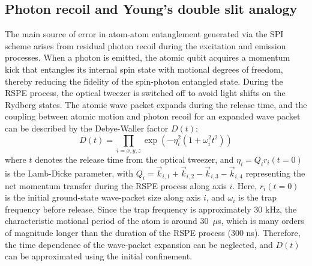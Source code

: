 \documentclass[aps,reprint,showpacs,superscriptaddress]{revtex4-2}
\begin{document}
\subsection{Photon recoil and Young's double slit analogy}
The main source of error in atom-atom entanglement generated via the SPI scheme arises from residual photon recoil during the excitation and emission processes. When a photon is emitted, the atomic qubit acquires a momentum kick that entangles its internal spin state with motional degrees of freedom, thereby reducing the fidelity of the spin-photon entangled state. During the RSPE process, the optical tweezer is switched off to avoid light shifts on the Rydberg states. The atomic wave packet expands during the release time, and the coupling between atomic motion and photon recoil for an expanded wave packet can be described by the Debye-Waller factor $D(t)$:
\begin{equation}
	D(t) = \prod_{i = x,y,z}\exp{(-\eta_{i}^2(1+\omega_i^2 t^2))}
\end{equation}
where $t$ denotes the release time from the optical tweezer, and $\eta_i = Q_i r_i(t=0)$ is the Lamb-Dicke parameter, with $Q_i = \vec{k}_{i,1} + \vec{k}_{i,2}-\vec{k}_{i,3}-\vec{k}_{i,4}$ representing the net momentum transfer during the RSPE process along axis $i$. Here, $r_i(t=0)$ is the initial ground-state wave-packet size along axis $i$, and $\omega_i$ is the trap frequency before release. Since the trap frequency is approximately 30 kHz, the characteristic motional period of the atom is around 30~$\mu$s, which is many orders of magnitude longer than the duration of the RSPE process (300 ns). Therefore, the time dependence of the wave-packet expansion can be neglected, and $D(t)$ can be approximated using the initial confinement.
\end{document}
